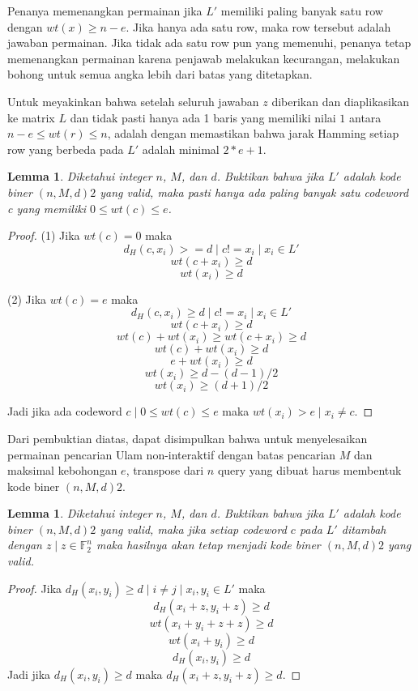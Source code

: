 \documentclass[conference,compsoc]{IEEEtran}
\newtheorem{lemma}[theorem]{Lemma}
\begin{document}
Penanya memenangkan permainan jika $L'$ memiliki paling banyak satu row dengan $wt(x) \ge n-e$. Jika hanya ada satu row, maka row tersebut adalah jawaban permainan. Jika tidak ada satu row pun yang memenuhi, penanya tetap memenangkan permainan karena penjawab melakukan kecurangan, melakukan bohong untuk semua angka lebih dari batas yang ditetapkan.

Untuk meyakinkan bahwa setelah seluruh jawaban $z$ diberikan dan diaplikasikan ke matrix $L$ dan tidak pasti hanya ada 1 baris yang memiliki nilai $1$ antara $n-e \le wt(r) \le n$, adalah dengan memastikan bahwa jarak Hamming setiap row yang berbeda pada $L'$ adalah minimal $2*e+1$.

\begin{lemma}
Diketahui integer $n$, $M$, dan $d$. Buktikan bahwa jika $L'$ adalah kode biner $(n,M,d)2$ yang valid, maka pasti hanya ada paling banyak satu codeword c yang memiliki $0 \le wt(c) \le e$.  
\end{lemma}

\begin{proof}
(1) Jika $wt(c) = 0$ maka
\[d_H(c,x_i) >= d \mid c != x_i \mid x_i \in L'\]
\[wt(c + x_i) \ge d\]
\[wt(x_i) \ge d\]

(2) Jika $wt(c) = e$ maka
\[d_H(c,x_i) \ge d \mid c != x_i \mid x_i ∈ L'\]
\[wt(c+x_i) \ge d\]
\[wt(c) + wt(x_i) \ge wt(c+x_i) \ge d\]
\[wt(c) + wt(x_i) \ge d\]
\[e + wt(x_i) \ge d\]
\[wt(x_i) \ge d - (d-1)/2\]
\[wt(x_i) \ge (d+1)/2\]

Jadi jika ada codeword $c \mid 0 \le wt(c) \le e$ maka $wt(x_i) > e \mid x_i \neq c$.
\end{proof}

Dari pembuktian diatas, dapat disimpulkan bahwa untuk menyelesaikan permainan pencarian Ulam non-interaktif dengan batas pencarian $M$ dan maksimal kebohongan $e$, transpose dari $n$ query yang dibuat harus membentuk kode biner $(n,M,d)2$.

\begin{lemma}
Diketahui integer $n$, $M$, dan $d$. Buktikan bahwa jika $L'$ adalah kode biner $(n,M,d)2$ yang valid, maka jika setiap codeword $c$ pada $L'$ ditambah dengan $z \mid z \in \mathbb{F}_2^n$ maka hasilnya akan tetap menjadi kode biner $(n,M,d)2$ yang valid.  
\end{lemma}

\begin{proof}
Jika $d_H(x_i,y_i) \ge d \mid i \neq j \mid x_i,y_i \in L'$ maka
\[d_H(x_i+z,y_i+z) \ge d\]
\[wt(x_i+y_i+z+z) \ge d\]
\[wt(x_i+y_i) \ge d\]
\[d_H(x_i,y_i) \ge d\]
Jadi jika $d_H(x_i,y_i) \ge d$ maka $d_H(x_i+z,y_i+z) \ge d$.
\end{proof}
\end{document}
